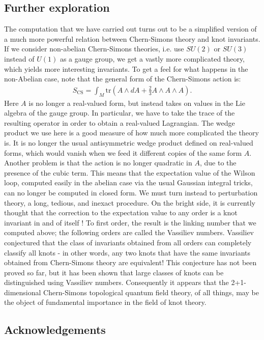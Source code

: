 \documentclass[12pt]{article}
\begin{document}
\subsection*{Further exploration}
The computation that we have carried out turns out to be a simplified version of a much more powerful relation between Chern-Simons theory and knot invariants. If we consider non-abelian Chern-Simons theories, i.e. use $SU(2)$ or $SU(3)$ instead of $U(1)$ as a gauge group, we get a vastly more complicated theory, which yields more interesting invariants. To get a feel for what happens in the non-Abelian case, note that the general form of the Chern-Simons action is:
\begin{align*}
S_{\text{CS}} = \int_M \text{tr}\left(A\wedge dA + \frac{2}{3}A\wedge A \wedge A\right).
\end{align*}
Here $A$ is no longer a real-valued form, but instead takes on values in the Lie algebra of the gauge group. In particular, we have to take the trace of the resulting operator in order to obtain a real-valued Lagrangian. The wedge product we use here is a good measure of how much more complicated the theory is. It is no longer the usual antisymmetric wedge product defined on real-valued forms, which would vanish when we feed it different copies of the same form $A$. Another problem is that the action is no longer quadratic in $A$, due to the presence of the cubic term. This means that the expectation value of the Wilson loop, computed easily in the abelian case via the usual Gaussian integral tricks, can no longer be computed in closed form. We must turn instead to perturbation theory, a long, tedious, and inexact procedure. On the bright side, it is currently thought that the correction to the expectation value to any order is a knot invariant in and of itself \cite{oldwine}! To first order, the result is the linking number that we computed above; the following orders are called the Vassiliev numbers. Vassiliev conjectured that the class of invariants obtained from all orders can completely classify all knots - in other words, any two knots that have the same invariants obtained from Chern-Simons theory are equivalent! This conjecture has not been proved so far, but it has been shown that large classes of knots can be distinguished using Vassiliev numbers. Consequently it appears that the  2+1-dimensional Chern-Simons topological quantum field theory, of all things, may be the object of fundamental importance in the field of knot theory.

\subsection*{Acknowledgements}
\end{document}
